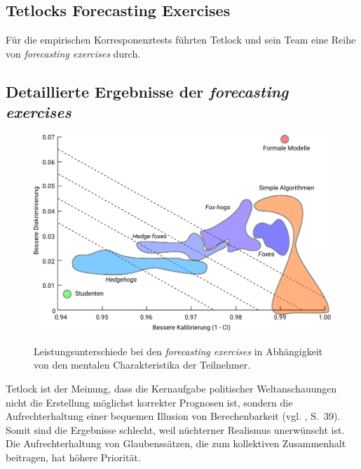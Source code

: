 \subsection{Tetlocks Forecasting Exercises}

Für die empirischen Korresponenztests führten Tetlock und sein Team eine Reihe
von \emph{forecasting exercises} durch. 

\subsection{Detaillierte Ergebnisse der \emph{forecasting exercises}}

\begin{figure}%
\centering
\caption{Leistungsunterschiede bei den \emph{forecasting exercises} in
  Abhängigkeit von den mentalen Charakteristika der Teilnehmer.}
\includegraphics[scale=0.9]{Grafiken/Tetlock_2_Ink.pdf} 
\label{pic:Tetlock_2}
\end{figure}

Tetlock ist der Meinung, dass die Kernaufgabe politischer Weltanschauungen
nicht die Erstellung möglichst korrekter Prognosen ist, sondern die
Aufrechterhaltung einer bequemen Illusion von Berechenbarkeit
(vgl. \cite{Tetlock}, S.~39). Somit sind die Ergebnisse schlecht, weil
nüchterner Realismus unerwünscht ist. Die Aufrechterhaltung von Glaubenssätzen,
die zum kollektiven Zusammenhalt beitragen, hat höhere Priorität.

